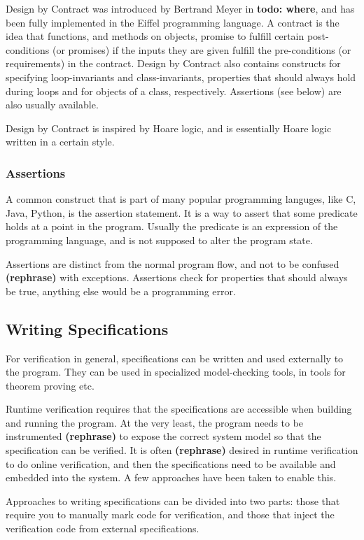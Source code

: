 \documentclass[a4paper,11pt]{kth-mag}
\newcommand{\todo}[1]{\textbf{todo: #1}}
\newcommand{\rephrase}{\textbf{(rephrase)} }
\begin{document}
Design by Contract was introduced by Bertrand Meyer in \todo{where}, and has
been fully implemented in the Eiffel programming language. A contract is the
idea that functions, and methods on objects, promise to fulfill certain
post-conditions (or promises) if the inputs they are given fulfill the
pre-conditions (or requirements) in the contract. Design by Contract also
contains constructs for specifying loop-invariants and class-invariants,
properties that should always hold during loops and for objects of a class,
respectively. Assertions (see below) are also usually available.

Design by Contract is inspired by Hoare logic, and is essentially Hoare logic
written in a certain style.


\subsubsection{Assertions}

A common construct that is part of many popular programming languges, like C,
Java, Python, is the assertion statement. It is a way to assert that some
predicate holds at a point in the program. Usually the predicate is an
expression of the programming language, and is not supposed to alter the
program state.

Assertions are distinct from the normal program flow, and not to be confused
\rephrase with exceptions. Assertions check for properties that should always
be true, anything else would be a programming error.


\subsection{Writing Specifications}

For verification in general, specifications can be written and used externally
to the program. They can be used in specialized model-checking tools, in tools
for theorem proving etc.

Runtime verification requires that the specifications are accessible when
building and running the program. At the very least, the program needs to be
instrumented \rephrase to expose the correct system model so that the
specification can be verified. It is often \rephrase desired in runtime
verification to do online verification, and then the specifications need to be
available and embedded into the system. A few approaches have been taken to
enable this.

Approaches to writing specifications can be divided into two parts: those that
require you to manually mark code for verification, and those that inject the
verification code from external specifications.
\end{document}
